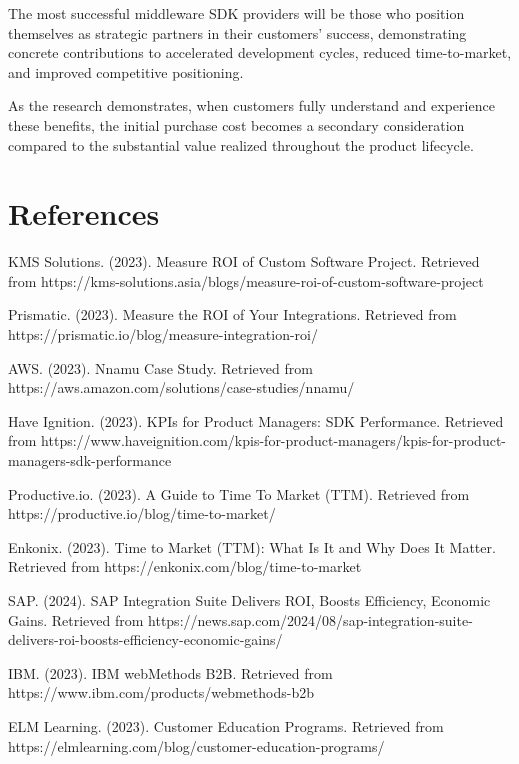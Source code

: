 \documentclass[11pt,a4paper]{article}
\begin{document}
The most successful middleware SDK providers will be those who position themselves as strategic partners in their customers' success, demonstrating concrete contributions to accelerated development cycles, reduced time-to-market, and improved competitive positioning.

As the research demonstrates, when customers fully understand and experience these benefits, the initial purchase cost becomes a secondary consideration compared to the substantial value realized throughout the product lifecycle.

\section*{References}

\begin{thebibliography}{99}

 KMS Solutions. (2023). Measure ROI of Custom Software Project. Retrieved from https://kms-solutions.asia/blogs/measure-roi-of-custom-software-project

 Prismatic. (2023). Measure the ROI of Your Integrations. Retrieved from https://prismatic.io/blog/measure-integration-roi/

 AWS. (2023). Nnamu Case Study. Retrieved from https://aws.amazon.com/solutions/case-studies/nnamu/

 Have Ignition. (2023). KPIs for Product Managers: SDK Performance. Retrieved from https://www.haveignition.com/kpis-for-product-managers/kpis-for-product-managers-sdk-performance

 Productive.io. (2023). A Guide to Time To Market (TTM). Retrieved from https://productive.io/blog/time-to-market/

 Enkonix. (2023). Time to Market (TTM): What Is It and Why Does It Matter. Retrieved from https://enkonix.com/blog/time-to-market

 SAP. (2024). SAP Integration Suite Delivers ROI, Boosts Efficiency, Economic Gains. Retrieved from https://news.sap.com/2024/08/sap-integration-suite-delivers-roi-boosts-efficiency-economic-gains/

 IBM. (2023). IBM webMethods B2B. Retrieved from https://www.ibm.com/products/webmethods-b2b

 ELM Learning. (2023). Customer Education Programs. Retrieved from https://elmlearning.com/blog/customer-education-programs/


\end{thebibliography}
\end{document}
